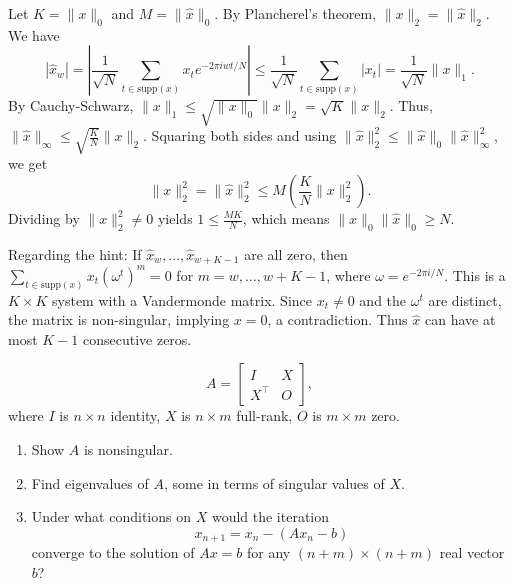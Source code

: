 \begin{solution}
Let $K = \|x\|_0$ and $M = \|\hat{x}\|_0$. By Plancherel's theorem, $\|x\|_2 = \|\hat{x}\|_2$. We have
\[
|\hat{x}_w| = \left| \frac{1}{\sqrt{N}} \sum_{t \in \text{supp}(x)} x_t e^{-2\pi iwt/N} \right| \leq \frac{1}{\sqrt{N}} \sum_{t \in \text{supp}(x)} |x_t| = \frac{1}{\sqrt{N}} \|x\|_1.
\]
By Cauchy-Schwarz, $\|x\|_1 \leq \sqrt{\|x\|_0} \|x\|_2 = \sqrt{K} \|x\|_2$. Thus, $\|\hat{x}\|_\infty \leq \sqrt{\frac{K}{N}} \|x\|_2$.
Squaring both sides and using $\|\hat{x}\|_2^2 \leq \|\hat{x}\|_0 \|\hat{x}\|_\infty^2$, we get
\[
\|x\|_2^2 = \|\hat{x}\|_2^2 \leq M \left( \frac{K}{N} \|x\|_2^2 \right).
\]
Dividing by $\|x\|_2^2 \neq 0$ yields $1 \leq \frac{MK}{N}$, which means $\|x\|_0 \|\hat{x}\|_0 \geq N$.

Regarding the hint: If $\hat{x}_w, \dots, \hat{x}_{w+K-1}$ are all zero, then $\sum_{t \in \text{supp}(x)} x_t (\omega^t)^m = 0$ for $m=w, \dots, w+K-1$, where $\omega = e^{-2\pi i/N}$. This is a $K \times K$ system with a Vandermonde matrix. Since $x_t \neq 0$ and the $\omega^t$ are distinct, the matrix is non-singular, implying $x=0$, a contradiction. Thus $\hat{x}$ can have at most $K-1$ consecutive zeros.
\end{solution}

\begin{exercise}
\label{applied:2014:8}
\[
A=\begin{bmatrix}I&X\\X^{\top}&O\end{bmatrix},
\]
where $I$ is $n\times n$ identity, $X$ is $n\times m$ full-rank, $O$ is $m\times m$ zero.

\begin{enumerate}
\item[(i)] Show $A$ is nonsingular.
\item[(ii)] Find eigenvalues of $A$, some in terms of singular values of $X$.
\item[(iii)] Under what conditions on $X$ would the iteration
\[
x_{n+1}=x_{n}-(Ax_{n}-b)
\]
converge to the solution of $Ax=b$ for any $(n+m)\times(n+m)$ real vector $b$?
\end{enumerate}
\end{exercise}

